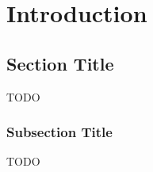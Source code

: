 \chapter{Introduction}
\label{ch:introduction}


\section{Section Title}
TODO

\subsection{Subsection Title}
TODO